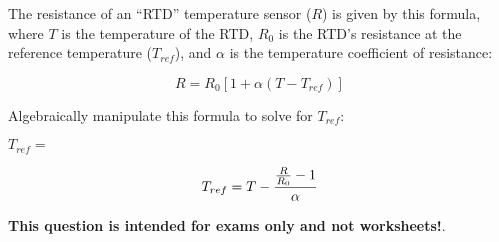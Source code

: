 

The resistance of an ``RTD'' temperature sensor ($R$) is given by this formula, where $T$ is the temperature of the RTD, $R_0$ is the RTD's resistance at the reference temperature ($T_{ref}$), and $\alpha$ is the temperature coefficient of resistance:
 
$$R = R_0 [1 + \alpha (T - T_{ref})]$$

Algebraically manipulate this formula to solve for $T_{ref}$:

\vskip 20pt

$T_{ref} = $







$$T_{ref} = T - {{{R \over R_0} - 1} \over \alpha}$$







{\bf This question is intended for exams only and not worksheets!}.



